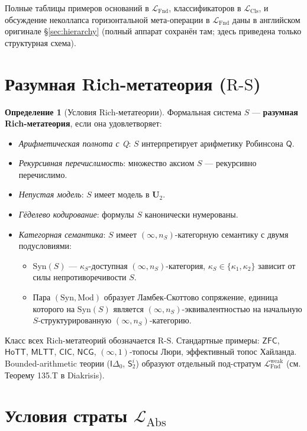 \documentclass[11pt]{article}
\theoremstyle{plain}
\theoremstyle{definition}
\newtheorem{definition}[theorem]{Определение}
\newcommand{\RS}{\mathrm{R\text{-}S}}
\newcommand{\LFnd}{\mathcal{L}_{\mathrm{Fnd}}}
\newcommand{\LCls}{\mathcal{L}_{\mathrm{Cls}}}
\newcommand{\LAbs}{\mathcal{L}_{\mathrm{Abs}}}
\newcommand{\Syn}{\mathrm{Syn}}
\newcommand{\Mod}{\mathrm{Mod}}
\newcommand{\ZFC}{\mathsf{ZFC}}
\newcommand{\MLTT}{\mathsf{MLTT}}
\newcommand{\HoTT}{\mathsf{HoTT}}
\newcommand{\CIC}{\mathsf{CIC}}
\newcommand{\NCG}{\ensuremath{\mathsf{NCG}}}
\begin{document}
Полные таблицы примеров оснований в $\LFnd$, классификаторов в $\LCls$, и обсуждение неколлапса горизонтальной мета-операции в $\LFnd$ даны в английском оригинале \S\ref{sec:hierarchy} (полный аппарат сохранён там; здесь приведена только структурная схема).

\section{Разумная Rich-метатеория ($\RS$)}\label{sec:rs}

\begin{definition}[Условия Rich-метатеории]\label{def:rs}
Формальная система $S$ — \textbf{разумная Rich-метатеория}, если она удовлетворяет:
\begin{itemize}
\item[\textbf{(R1)}] \emph{Арифметическая полнота с Q}: $S$ интерпретирует арифметику Робинсона $\mathsf{Q}$.
\item[\textbf{(R2)}] \emph{Рекурсивная перечислимость}: множество аксиом $S$ — рекурсивно перечислимо.
\item[\textbf{(R3)}] \emph{Непустая модель}: $S$ имеет модель в $\mathbf{U}_2$.
\item[\textbf{(R4)}] \emph{Гёделево кодирование}: формулы $S$ канонически нумерованы.
\item[\textbf{(R5)}] \emph{Категорная семантика}: $S$ имеет $(\infty, n_S)$-категорную семантику с двумя подусловиями:
  \begin{itemize}
  \item[(R5a)] $\Syn(S)$ — $\kappa_S$-доступная $(\infty, n_S)$-категория, $\kappa_S \in \{\kappa_1, \kappa_2\}$ зависит от силы непротиворечивости $S$.
  \item[(R5b)] Пара $(\Syn, \Mod)$ образует Ламбек-Скоттово сопряжение, единица которого на $\Syn(S)$ является $(\infty, n_S)$-эквивалентностью на начальную $S$-структурированную $(\infty, n_S)$-категорию.
  \end{itemize}
\end{itemize}
\end{definition}

Класс всех Rich-метатеорий обозначается $\RS$. Стандартные примеры: $\ZFC$, $\HoTT$, $\MLTT$, $\CIC$, $\NCG$, $(\infty,1)$-топосы Люри, эффективный топос Хайланда. Bounded-arithmetic теории ($\mathsf{I}\Delta_0$, $\mathsf{S}_2^i$) образуют отдельный под-стратум $\LFnd^\mathrm{weak}$ (см. Теорему 135.T в Diakrisis).

\section{Условия страты $\LAbs$}\label{sec:conditions}
\end{document}
